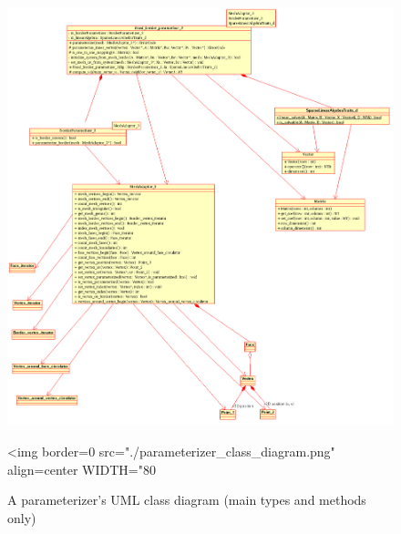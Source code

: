 \begin{figure}[bht]
    \begin{center}
        \begin{ccTexOnly}
            \includegraphics{Parameterization/parameterizer_class_diagram}
        \end{ccTexOnly}
        \begin{ccHtmlOnly}
            <img border=0 src="./parameterizer_class_diagram.png" align=center WIDTH="80%
        \end{ccHtmlOnly}
        \label{parameterization-fig-parameterizer_class_diagram}

        \caption{A parameterizer's UML class diagram (main types and methods only)}
    \end{center}
\end{figure}

